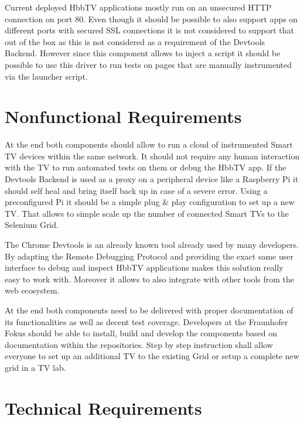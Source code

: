 Current deployed HbbTV applications mostly run on an unsecured HTTP connection on port 80.
Even though it should be possible to also support apps on different ports with secured SSL
connections it is not considered to support that out of the box as this is not considered
as a requirement of the Devtools Backend. However since this component allows to inject a
script it should be possible to use this driver to run tests on pages that are manually
instrumented via the launcher script.

\section{Nonfunctional Requirements\label{sec:techreq}}

At the end both components should allow to run a cloud of instrumented Smart TV devices
within the same network. It should not require any human interaction with the TV to run
automated tests on them or debug the HbbTV app. If the Devtools Backend is used as a
proxy on a peripheral device like a Raspberry Pi it should self heal and bring itself back
up in case of a severe error. Using a preconfigured Pi it should be a simple plug \& play
configuration to set up a new TV. That allows to simple scale up the number of connected
Smart TVs to the Selenium Grid.

The Chrome Devtools is an already known tool already used by many developers. By adapting
the Remote Debugging Protocol and providing the exact same user interface to debug and inspect
HbbTV applications makes this solution really easy to work with. Moreover it allows to
also integrate with other tools from the web ecosystem.

At the end both components need to be delivered with proper documentation of its
functionalities as well as decent test coverage. Developers at the Fraunhofer Fokus should
be able to install, build and develop the components based on documentation within the
repositories. Step by step instruction shall allow everyone to set up an additional TV
to the existing Grid or setup a complete new grid in a TV lab.

\section{Technical Requirements\label{sec:techreq}}

